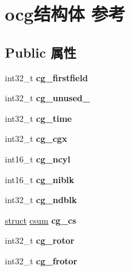 \hypertarget{structocg}{}\section{ocg结构体 参考}
\label{structocg}
\subsection*{Public 属性}
\begin{DoxyCompactItemize}
\item 
\mbox{\label{structocg_aab0d8aac9fde9cd2fef3c6039f6e0a0d}} 
int32\+\_\+t {\bfseries cg\+\_\+firstfield}
\item 
\mbox{\label{structocg_a2825ebb009fcfc8ecfe32cef94d3eab5}} 
int32\+\_\+t {\bfseries cg\+\_\+unused\+\_}
\item 
\mbox{\label{structocg_af2dd670ad75f5efa45f5ab2c91730ccb}} 
int32\+\_\+t {\bfseries cg\+\_\+time}
\item 
\mbox{\label{structocg_a74440250032a7d11728bf2c626eb32cb}} 
int32\+\_\+t {\bfseries cg\+\_\+cgx}
\item 
\mbox{\label{structocg_a9abb0f36c79be972105520ecfe4a40cd}} 
int16\+\_\+t {\bfseries cg\+\_\+ncyl}
\item 
\mbox{\label{structocg_a8781c66cb9d9109b83070c2b8b602e9e}} 
int16\+\_\+t {\bfseries cg\+\_\+niblk}
\item 
\mbox{\label{structocg_adb7b1a9deeee0ee1fd436236c1340617}} 
int32\+\_\+t {\bfseries cg\+\_\+ndblk}
\item 
\mbox{\label{structocg_a776dc93baee9838ad4104435b9135a29}} 
\hyperlink{interfacestruct}{struct} \hyperlink{structcsum}{csum} {\bfseries cg\+\_\+cs}
\item 
\mbox{\label{structocg_a18126ecef7df96a341be7d48c852a366}} 
int32\+\_\+t {\bfseries cg\+\_\+rotor}
\item 
\mbox{\label{structocg_a3b02df88ccaa1b4f38e0d60adfca83ba}} 
int32\+\_\+t {\bfseries cg\+\_\+frotor}
\item 

\end{DoxyCompactItemize}
